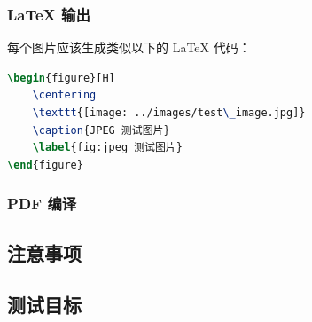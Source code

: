 \documentclass[UTF8, a4paper, 12pt]{ctexart}
\begin{document}
\subsubsection{LaTeX 输出}

每个图片应该生成类似以下的 LaTeX 代码：


\begin{lstlisting}[language=TeX, basicstyle=\ttfamily\small, breaklines=true]
\begin{figure}[H]
    \centering
    \texttt{[image: ../images/test\_image.jpg]}
    \caption{JPEG 测试图片}
    \label{fig:jpeg_测试图片}
\end{figure}

\end{lstlisting}


\subsubsection{PDF 编译}

\subsection{注意事项}


\subsection{测试目标}
\end{document}
